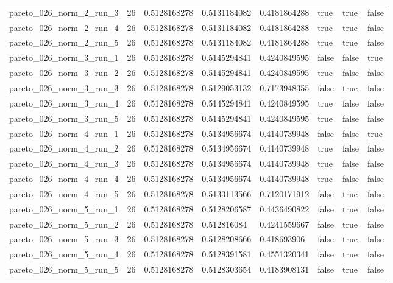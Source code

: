 \begin{tabular}{@{}llllllll@{}}
pareto\_026\_norm\_2\_run\_3 & 26 & 0.5128168278 & 0.5131184082 & 0.4181864288 & true & true & false \\
pareto\_026\_norm\_2\_run\_4 & 26 & 0.5128168278 & 0.5131184082 & 0.4181864288 & true & true & false \\
pareto\_026\_norm\_2\_run\_5 & 26 & 0.5128168278 & 0.5131184082 & 0.4181864288 & true & true & false \\
pareto\_026\_norm\_3\_run\_1 & 26 & 0.5128168278 & 0.5145294841 & 0.4240849595 & false & false & true \\
pareto\_026\_norm\_3\_run\_2 & 26 & 0.5128168278 & 0.5145294841 & 0.4240849595 & true & false & false \\
pareto\_026\_norm\_3\_run\_3 & 26 & 0.5128168278 & 0.5129053132 & 0.7173948355 & false & true & false \\
pareto\_026\_norm\_3\_run\_4 & 26 & 0.5128168278 & 0.5145294841 & 0.4240849595 & true & false & false \\
pareto\_026\_norm\_3\_run\_5 & 26 & 0.5128168278 & 0.5145294841 & 0.4240849595 & true & false & false \\
pareto\_026\_norm\_4\_run\_1 & 26 & 0.5128168278 & 0.5134956674 & 0.4140739948 & false & false & true \\
pareto\_026\_norm\_4\_run\_2 & 26 & 0.5128168278 & 0.5134956674 & 0.4140739948 & true & false & false \\
pareto\_026\_norm\_4\_run\_3 & 26 & 0.5128168278 & 0.5134956674 & 0.4140739948 & true & false & false \\
pareto\_026\_norm\_4\_run\_4 & 26 & 0.5128168278 & 0.5134956674 & 0.4140739948 & true & false & false \\
pareto\_026\_norm\_4\_run\_5 & 26 & 0.5128168278 & 0.5133113566 & 0.7120171912 & false & true & false \\
pareto\_026\_norm\_5\_run\_1 & 26 & 0.5128168278 & 0.5128206587 & 0.4436490822 & false & true & false \\
pareto\_026\_norm\_5\_run\_2 & 26 & 0.5128168278 & 0.512816084 & 0.4241559667 & false & true & false \\
pareto\_026\_norm\_5\_run\_3 & 26 & 0.5128168278 & 0.5128208666 & 0.418693906 & false & true & false \\
pareto\_026\_norm\_5\_run\_4 & 26 & 0.5128168278 & 0.5128391581 & 0.4551320341 & false & true & false \\
pareto\_026\_norm\_5\_run\_5 & 26 & 0.5128168278 & 0.5128303654 & 0.4183908131 & false & true & false \\

\end{tabular}
